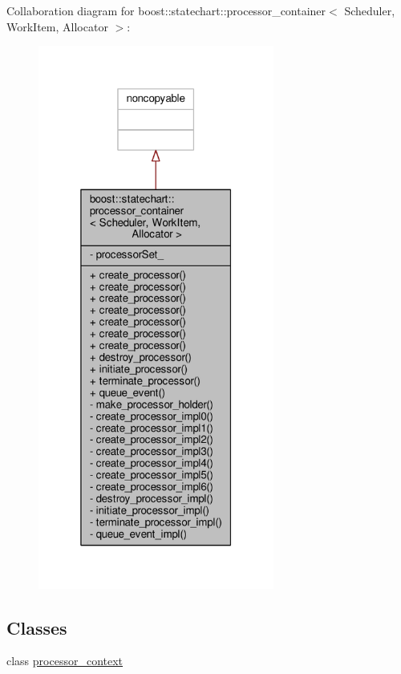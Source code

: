 Collaboration diagram for boost\+:\+:statechart\+:\+:processor\+\_\+container$<$ Scheduler, Work\+Item, Allocator $>$\+:
\nopagebreak
\begin{figure}[H]
\begin{center}
\leavevmode
\includegraphics[width=220pt]{classboost_1_1statechart_1_1processor__container__coll__graph}
\end{center}
\end{figure}
\subsection*{Classes}
\begin{DoxyCompactItemize}
\item 
class \mbox{\hyperlink{classboost_1_1statechart_1_1processor__container_1_1processor__context}{processor\+\_\+context}}
\end{DoxyCompactItemize}
